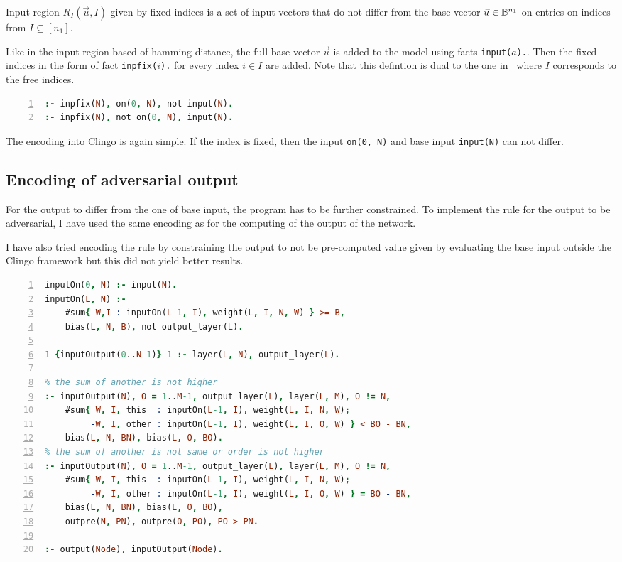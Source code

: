\documentclass[
    digital,
    color,
    oneside,
    sansbold,
    lot,
    nolof
]{fithesis}
\begin{document}
Input region $R_I(\vec u, I)$ given by fixed indices is
a set of input vectors that do not
differ from the base vector $\vec u \in \mathbb{B}^{n_1}$ on entries
on indices from $I \subseteq [n_1]$.

Like in the input region based of hamming distance, the full base vector $\vec u$
is added to the model using facts \texttt{input($a$).}. Then the fixed indices
in the form of fact \texttt{inpfix($i$).} for every index $i\in I$ are added.
Note that this defintion is dual to the one in~\cite{10.1145/3563212} where
$I$ corresponds to the free indices.

\begin{lstlisting}[language=prolog, numbers=left, countblanklines=false]
% input does not differ from base on fixed indices
:- inpfix(N), on(0, N), not input(N).
:- inpfix(N), not on(0, N), input(N).
\end{lstlisting}
The encoding into Clingo is again simple. If the index is fixed, then the
input \texttt{on(0, N)} and base input \texttt{input(N)} can not differ.

\subsection{Encoding of adversarial output}

For the output to differ from the one of base input, the program has to be
further constrained. To implement the rule for the output to be adversarial,
I have used the same encoding as for the computing of the output of the
network.

I have also tried encoding the rule by constraining the output to not be
pre-computed value given by evaluating the base input outside the Clingo framework
but this did not yield better results.

\begin{lstlisting}[language=prolog, numbers=left, countblanklines=false]
% Show only inputs with output nonequal to that of input vector
inputOn(0, N) :- input(N).
inputOn(L, N) :-
    #sum{ W,I : inputOn(L-1, I), weight(L, I, N, W) } >= B,
    bias(L, N, B), not output_layer(L).

1 {inputOutput(0..N-1)} 1 :- layer(L, N), output_layer(L).

% the sum of another is not higher
:- inputOutput(N), O = 1..M-1, output_layer(L), layer(L, M), O != N,
    #sum{ W, I, this  : inputOn(L-1, I), weight(L, I, N, W);
         -W, I, other : inputOn(L-1, I), weight(L, I, O, W) } < BO - BN,
    bias(L, N, BN), bias(L, O, BO).
% the sum of another is not same or order is not higher
:- inputOutput(N), O = 1..M-1, output_layer(L), layer(L, M), O != N,
    #sum{ W, I, this  : inputOn(L-1, I), weight(L, I, N, W);
         -W, I, other : inputOn(L-1, I), weight(L, I, O, W) } = BO - BN,
    bias(L, N, BN), bias(L, O, BO),
    outpre(N, PN), outpre(O, PO), PO > PN.

:- output(Node), inputOutput(Node).
\end{lstlisting}
\end{document}
